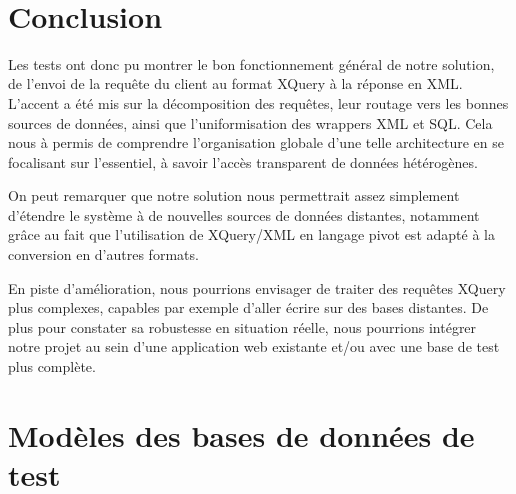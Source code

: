 \documentclass[a4paper,10pt]{article}
\begin{document}
\FloatBarrier
~~\\
\newpage
\section{Conclusion}

Les tests ont donc pu montrer le bon fonctionnement général de notre solution, de l'envoi de la requête du client au format XQuery à la réponse en XML. L'accent a été mis sur la décomposition des requêtes, leur routage vers les bonnes sources de données, ainsi que l'uniformisation des wrappers XML et SQL. Cela nous à permis de comprendre l'organisation globale d'une telle architecture en se focalisant sur l'essentiel, à savoir l'accès transparent de données hétérogènes.

On peut remarquer que notre solution nous permettrait assez simplement d'étendre le système à de nouvelles sources de données distantes, notamment grâce au fait que l'utilisation de XQuery/XML en langage pivot est adapté à la conversion en d'autres formats.

En piste d'amélioration, nous pourrions envisager de traiter des requêtes XQuery plus complexes, capables par exemple d'aller écrire sur des bases distantes. De plus pour constater sa robustesse en situation réelle, nous pourrions intégrer notre projet au sein d'une application web existante et/ou avec une base de test plus complète.


\newpage
\appendix
\section{Modèles des bases de données de test}
\label{lst:modeleBDDs}
\end{document}
